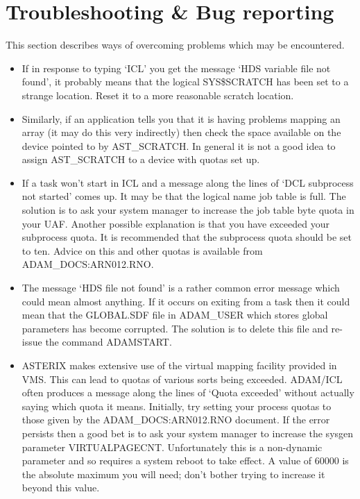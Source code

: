 \section{Troubleshooting \& Bug reporting}

This section describes ways of overcoming problems which may be encountered.
\begin{itemize}
\item If in response to typing `ICL' you get the message `HDS variable
   file not found', it probably means that the logical SYS\$SCRATCH 
   has been set to a strange location. Reset it to a more reasonable 
   scratch location.
\item Similarly, if an application tells you that it is having problems 
   mapping an array (it may do this very indirectly) then check the
   space available on the device pointed to by AST\_SCRATCH. In general
   it is not a good idea to assign AST\_SCRATCH to a device with quotas
   set up. 

\item If a task won't start in ICL and a message along the lines of `DCL 
   subprocess not started' comes up. It may be that the logical name 
   job table is full. The solution is to ask your system manager to 
   increase the job table byte quota in your UAF. Another possible 
   explanation is that you have exceeded your subprocess quota. It 
   is recommended that the subprocess quota should be set to ten. 
   Advice on this and other quotas is available from 
   ADAM\_DOCS:ARN012.RNO.

\item The message `HDS file not found' is a rather common error message 
   which could mean almost anything. If it occurs on exiting from a
   task then it could mean that the GLOBAL.SDF file in ADAM\_USER which
   stores global parameters has become corrupted. The solution is to
   delete this file and re-issue the command ADAMSTART.

\item ASTERIX makes extensive use of the virtual mapping facility
   provided in VMS. This can lead to quotas of various sorts being
   exceeded. ADAM/ICL often produces a message along the lines of
   `Quota exceeded' without actually saying which quota it means. 
   Initially, try setting your process quotas to those given by the
   ADAM\_DOCS:ARN012.RNO document. If the error persists then a 
   good bet is to ask your system manager to increase 
   the sysgen parameter VIRTUALPAGECNT. Unfortunately this is a
   non-dynamic parameter and so requires a system reboot to take
   effect. A value of 60000 is the absolute maximum you will need;
   don't bother trying to increase it beyond this value.


\end{itemize}
